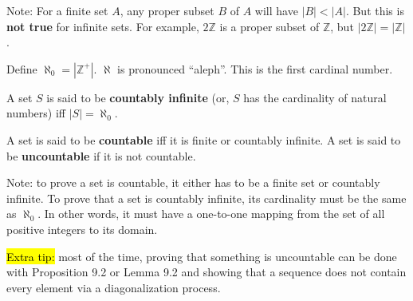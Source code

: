 \documentclass{article}
\begin{document}
\begin{description}
	\item \qquad Note: For a finite set $A$, any proper subset $B$ of $A$ will have $|B|<|A|$. But this is \textbf{not true} for infinite sets. For example, $2\mathbb{Z}$ is a proper subset of $\mathbb{Z}$, but $|2\mathbb{Z}|=|\mathbb{Z}|$.
	\item[Cardinal Numbers] Define $\aleph_{0}=|\mathbb{Z}^{+}|$. $\aleph$ is pronounced ``aleph''. This is the first cardinal number.
	\item[Countably Infinite]A set $S$ is said to be \textbf{countably infinite} (or, $S$ has the cardinality of natural numbers) iff $|S|=\aleph_{0}$.
	\item[Countable set and Uncountable Set]A set is said to be \textbf{countable} iff it is finite or countably infinite. A set is said to be \textbf{uncountable} if it is not countable.
	\item \qquad Note: to prove a set is countable, it either has to be a finite set or countably infinite. To prove that a set is countably infinite, its cardinality must be the same as $\aleph_{0}$. In other words, it must have a one-to-one mapping from the set of all positive integers to its domain.
	\item \qquad \hl{Extra tip:} most of the time, proving that something is uncountable can be done with Proposition 9.2 or Lemma 9.2 and showing that a sequence does not contain every element via a diagonalization process.


\end{description}
\end{document}
